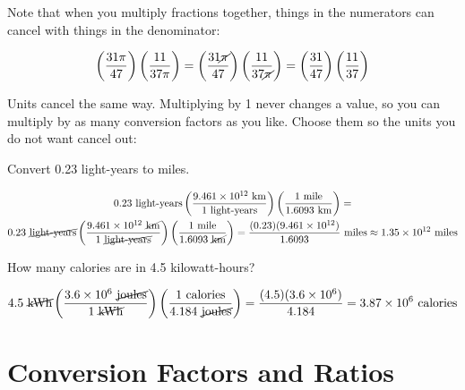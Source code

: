 Note that when you multiply fractions together, things in the numerators can cancel with things in the denominator:

$$\left( \frac{31\pi}{47} \right) \left( \frac{11}{37\pi}\right) = \left(\frac{31\cancel{\pi}}{47}\right) \left( \frac{11}{37\cancel{\pi}}\right) = \left(\frac{31}{47} \right) \left( \frac{11}{37} \right)$$

Units cancel the same way. Multiplying by 1 never changes a value, so you can multiply by as many conversion factors as you like. Choose them so the units you do not want cancel out:

\begin{Worked}
\begin{Problem}
Convert 0.23 light-years to miles.
\end{Problem}
\begin{Solution}
\begin{multline*}
  0.23 \text{ light-years} \left( \frac{9.461 \times 10^{12} \text{ km}}{1 \text{ light-years}} \right) \left( \frac{1 \text{ mile}}{1.6093 \text{ km}} \right) = \\
  0.23 \text{ \cancel{light-years}} \left( \frac{9.461 \times 10^{12} \text{ \cancel{km}}}{1 \text{ \cancel{light-years}}} \right) \left( \frac{1 \text{ mile}}{1.6093 \text{ \cancel{km}}}\right) = \frac{(0.23)(9.461 \times 10^{12})}{1.6093} \text{ miles} \approx 1.35 \times 10^{12} \text{ miles}
\end{multline*}
\end{Solution}
\end{Worked}

\begin{Exercise}[title={Simple Conversion Factors}, label=simple_conversion_factors]

  How many calories are in 4.5 kilowatt-hours?

\end{Exercise}
\begin{Answer}[ref=simple_conversion_factors]

  $$4.5 \text{ \cancel{kWh}} \left( \frac{3.6 \times 10^{6} \text{ \cancel{joules}}}{1 \text{ \cancel{kWh}}} \right) \left( \frac{1 \text{ calories}}{4.184 \text{ \cancel{joules}}}\right) = \frac{(4.5)(3.6 \times 10^6)}{4.184} = 3.87 \times 10^6 \text{ calories}$$

\end{Answer}

\section{Conversion Factors and Ratios}

